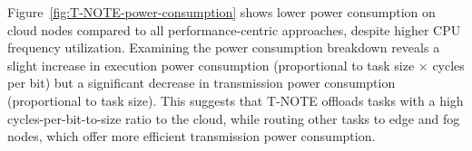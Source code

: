 \documentclass[preprint,3p,authoryear]{elsarticle}
\begin{document}
Figure~\ref{fig:T-NOTE-power-consumption} shows lower power consumption on cloud nodes compared to all performance-centric approaches, despite higher CPU frequency utilization. Examining the power consumption breakdown reveals a slight increase in execution power consumption (proportional to task size $\times$ cycles per bit) but a significant decrease in transmission power consumption (proportional to task size). This suggests that T-NOTE offloads tasks with a high cycles-per-bit-to-size ratio to the cloud, while routing other tasks to edge and fog nodes, which offer more efficient transmission power consumption.








\end{document}
